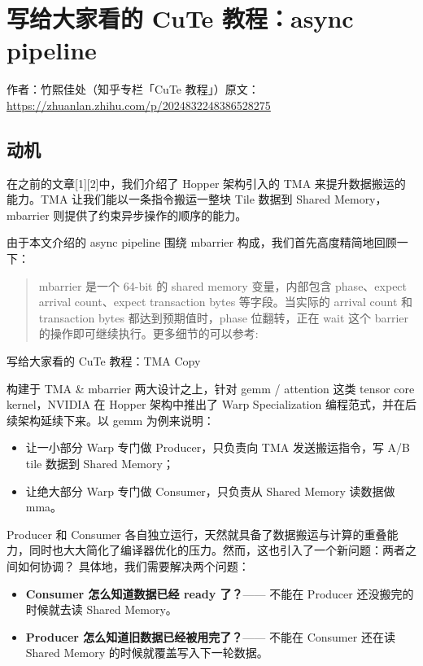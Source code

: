 \chapter{写给大家看的 CuTe 教程：async pipeline}

\begin{center}\small 作者：竹熙佳处（知乎专栏「CuTe 教程」）\quad 原文：\url{https://zhuanlan.zhihu.com/p/2024832248386528275}\end{center}

\section{动机}

在之前的文章[1][2]中，我们介绍了 Hopper 架构引入的 TMA 来提升数据搬运的能力。TMA 让我们能以一条指令搬运一整块 Tile 数据到 Shared Memory，mbarrier 则提供了约束异步操作的顺序的能力。

由于本文介绍的 async pipeline 围绕 mbarrier 构成，我们首先高度精简地回顾一下：

\begin{quote}
mbarrier 是一个 64-bit 的 shared memory 变量，内部包含 phase、expect arrival count、expect transaction bytes 等字段。当实际的 arrival count 和 transaction bytes 都达到预期值时，phase 位翻转，正在 wait 这个 barrier 的操作即可继续执行。更多细节的可以参考:
\end{quote}

写给大家看的 CuTe 教程：TMA Copy

构建于 TMA \& mbarrier 两大设计之上，针对 gemm / attention 这类 tensor core kernel，NVIDIA 在 Hopper 架构中推出了 Warp Specialization 编程范式，并在后续架构延续下来。以 gemm 为例来说明：

\begin{itemize}
  \item 让一小部分 Warp 专门做 Producer，只负责向 TMA 发送搬运指令，写 A/B tile 数据到 Shared Memory；
  \item 让绝大部分 Warp 专门做 Consumer，只负责从 Shared Memory 读数据做 mma。
\end{itemize}

Producer 和 Consumer 各自独立运行，天然就具备了数据搬运与计算的重叠能力，同时也大大简化了编译器优化的压力。然而，这也引入了一个新问题：两者之间如何协调？ 具体地，我们需要解决两个问题：

\begin{itemize}
  \item \textbf{Consumer 怎么知道数据已经 ready 了？}—— 不能在 Producer 还没搬完的时候就去读 Shared Memory。
  \item \textbf{Producer 怎么知道旧数据已经被用完了？}—— 不能在 Consumer 还在读 Shared Memory 的时候就覆盖写入下一轮数据。
\end{itemize}

